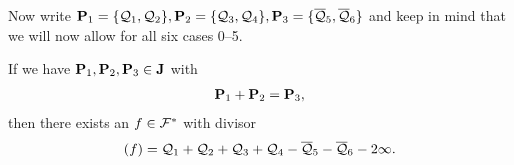 \documentclass[english,11pt,a4paper]{article}
\begin{document}

Now write $\P_1 = \{ \q_1, \q_2 \}, \P_2 = \{ \q_3, \q_4 \}, \P_3 = \{ \bar \q_5, \bar \q_6 \}$ and keep in mind that we will now allow for all six cases 0--5.

\begin{theorem}\label{hhs}
  If we have $\P_1, \P_2, \P_3 \in \J$ with
  \begin{align*}
    \P_1 + \P_2 = \P_3,
  \end{align*}
  then there exists an $f \in \F^*$ with divisor
  \begin{align*}
    (f) = \q_1 + \q_2 + \q_3 + \q_4 - \bar \q_5 - \bar \q_6 - 2 \infty.
  \end{align*}
\end{theorem}

\newpage
\end{document}
